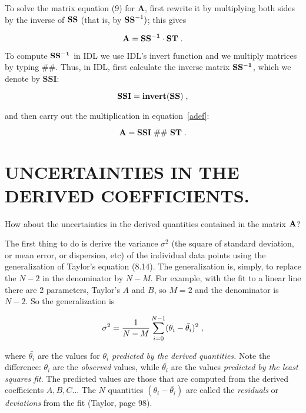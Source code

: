 	To solve the matrix equation (9) for {\bf A}, first rewrite it
by multiplying both sides by the inverse of ${\bf SS}$ (that is, by
${\bf SS}^{-1})$; this gives

\begin{equation}
\label{adef}
{\bf A} = {\bf SS^{-1} \cdot ST} \; .
\end{equation}

\noindent To compute $\bf SS^{-1}$ in IDL we use IDL's invert function
and we multiply matrices by typing $\#\#$.  Thus, in IDL, first
calculate the inverse matrix $\bf SS^{-1}$, which we denote by {\bf
SSI}:

\begin{equation}
\label{ssidef}
{\bf SSI} = {\bf invert(SS)} \; ,
\end{equation}

\noindent and then carry out the multiplication in equation~\ref{adef}:

\begin{equation}
\label{idladef}
{\bf A} = {\bf SSI \ \#\# \ ST} \; .
\end{equation}

\section{UNCERTAINTIES IN THE DERIVED COEFFICIENTS.}

	How about the uncertainties in the derived quantities contained
in the matrix ${\bf A}$?

	The first thing to do is derive the variance $\sigma^2$ (the
square of standard deviation, or mean error, or dispersion, etc) of the
individual data points using the generalization of Taylor's equation
(8.14).  The generalization is, simply, to replace the $N-2$ in the
denominator by $N-M$.  For example, with the fit to a linear line there
are 2 parameters, Taylor's $A$ and $B$, so $M=2$ and the denominator is
$N-2$.  So the generalization is

\begin{equation} \sigma^2 = {1 \over N - M} \sum_{i=0}^{N-1} (\theta_i -
\bar{\theta_i})^2 \; , 
\end{equation}

\noindent where $\bar{\theta_i}$ are the values for $\theta_i$ {\it
predicted by the derived quantities.} Note the difference: $\theta_i$
are the {\it observed} values, while $\bar{\theta_i}$ are the values
{\it predicted by the least squares fit}.  The predicted values are
those that are computed from the derived coefficients $A, B, C\dots$ The
$N$ quantities $(\theta_i - \bar{\theta_i})$ are called the {\it
residuals} or {\it deviations} from the fit (Taylor, page 98). 

